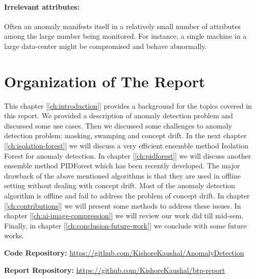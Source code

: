 \paragraph{Irrelevant attributes:}
Often an anomaly manifests itself in a relatively small number of attributes among the large number being monitored. 
For instance, a single machine in a large data-center might be compromised and behave abnormally.

\section{Organization of The Report}
\label{sec:organization-of-the-report}

This chapter [\ref{ch:introduction}] provides a background for the topics covered in this report.
We provided a description of anomaly detection problem and discussed some use cases.
Then we discussed some challenges to anomaly detection problem: masking, swamping and concept drift.
In the next chapter [\ref{ch:isolation-forest}] we will discuss a very efficient ensemble method Isolation Forest for anomaly detection.
In chapter [\ref{ch:pidforest}] we will discuss another ensemble method PIDForest which has been recently developed.
The major drawback of the above mentioned algorithms is that they are used in offline setting without dealing with concept drift.
Most of the anomaly detection algorithm is offline and fail to address the problem of concept drift.
In chapter [\ref{ch:contributions}] we will present some methods to address these issues.
In chapter [\ref{ch:ai-image-compression}] we will review our work did till mid-sem.
Finally, in chapter [\ref{ch:conclusion-future-work}] we conclude with some future works.

\vspace{2em}

\textbf{Code Repository: } \url{https://github.com/KishoreKaushal/AnomalyDetection}

\textbf{Report Repository: } \url{https://github.com/KishoreKaushal/btp-report}
